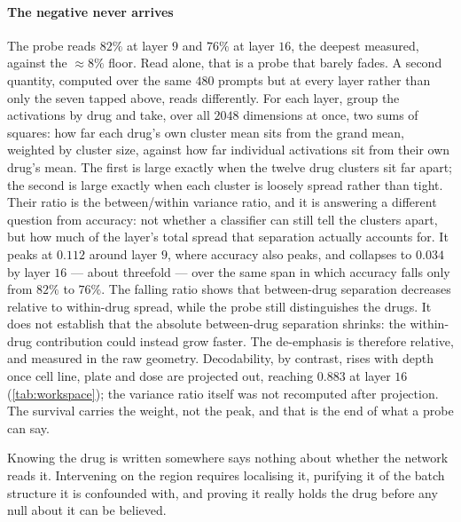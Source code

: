 \paragraph{The negative never arrives} The probe reads $82\%$ at layer $9$ and
$76\%$ at layer $16$, the deepest measured, against the $\approx 8\%$ floor.
Read alone, that is a probe that barely fades. A second quantity, computed over
the same $480$ prompts but at every layer rather than only the seven tapped
above, reads differently. For each layer, group the activations by drug and
take, over all $2048$ dimensions at once, two sums of squares: how far each
drug's own cluster mean sits from the grand mean, weighted by cluster size,
against how far individual activations sit from their own drug's mean. The
first is large exactly when the twelve drug clusters sit far apart; the second
is large exactly when each cluster is loosely spread rather than tight. Their
ratio is the between/within variance ratio, and it is answering a different
question from accuracy: not whether a classifier can still tell the clusters
apart, but how much of the layer's total spread that separation actually
accounts for. It peaks at $0.112$ around layer $9$, where accuracy also peaks,
and collapses to $0.034$ by layer $16$ --- about threefold --- over the same
span in which accuracy falls only from $82\%$ to $76\%$. The falling ratio
shows that between-drug separation decreases relative to within-drug spread,
while the probe still distinguishes the drugs. It does not establish that
the absolute between-drug separation shrinks: the within-drug contribution
could instead grow faster. The de-emphasis is therefore relative, and measured
in the raw geometry. Decodability, by contrast, rises with depth once cell line,
plate and dose are projected out, reaching $0.883$ at layer $16$
(\cref{tab:workspace}); the variance ratio itself was not recomputed after projection. The
survival carries the weight, not the peak, and that is the end of what a probe
can say.




\begin{question}[3]
Knowing the drug is written somewhere says nothing about whether the network
reads it. Intervening on the region requires localising it, purifying it of the
batch structure it is confounded with, and proving it really holds the drug
before any null about it can be believed.
\end{question}


